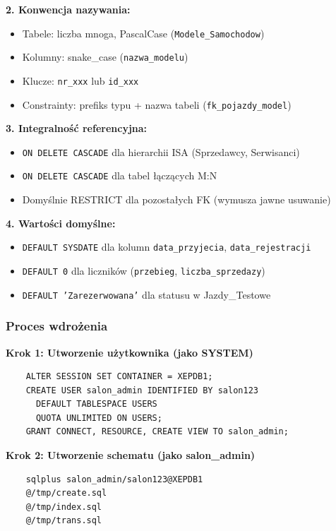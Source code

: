 \documentclass[a4paper,titleauthor]{mwart}
\begin{document}
	\textbf{2. Konwencja nazywania:}
	\begin{itemize}
		\item Tabele: liczba mnoga, PascalCase (\texttt{Modele\_Samochodow})
		\item Kolumny: snake\_case (\texttt{nazwa\_modelu})
		\item Klucze: \texttt{nr\_xxx} lub \texttt{id\_xxx}
		\item Constrainty: prefiks typu + nazwa tabeli (\texttt{fk\_pojazdy\_model})
	\end{itemize}

	\textbf{3. Integralność referencyjna:}
	\begin{itemize}
		\item \texttt{ON DELETE CASCADE} dla hierarchii ISA (Sprzedawcy, Serwisanci)
		\item \texttt{ON DELETE CASCADE} dla tabel łączących M:N
		\item Domyślnie RESTRICT dla pozostałych FK (wymusza jawne usuwanie)
	\end{itemize}

	\textbf{4. Wartości domyślne:}
	\begin{itemize}
		\item \texttt{DEFAULT SYSDATE} dla kolumn \texttt{data\_przyjecia}, \texttt{data\_rejestracji}
		\item \texttt{DEFAULT 0} dla liczników (\texttt{przebieg}, \texttt{liczba\_sprzedazy})
		\item \texttt{DEFAULT 'Zarezerwowana'} dla statusu w Jazdy\_Testowe
	\end{itemize}

	\subsubsection{Proces wdrożenia}

	\textbf{Krok 1: Utworzenie użytkownika (jako SYSTEM)}
	\begin{verbatim}
	ALTER SESSION SET CONTAINER = XEPDB1;
	CREATE USER salon_admin IDENTIFIED BY salon123
	  DEFAULT TABLESPACE USERS
	  QUOTA UNLIMITED ON USERS;
	GRANT CONNECT, RESOURCE, CREATE VIEW TO salon_admin;
	\end{verbatim}

	\textbf{Krok 2: Utworzenie schematu (jako salon\_admin)}
	\begin{verbatim}
	sqlplus salon_admin/salon123@XEPDB1
	@/tmp/create.sql
	@/tmp/index.sql
	@/tmp/trans.sql
	\end{verbatim}
\end{document}
